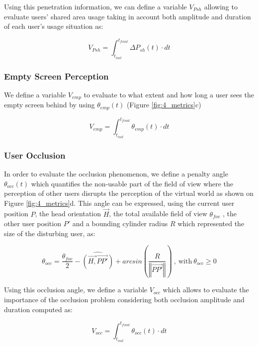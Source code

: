 Using this penetration information, we can define a variable $V_{Psh}$ allowing to evaluate users' shared area usage taking in account both amplitude and duration of each user's usage situation as:

\begin{equation}
V_{Psh}=\int_{t_{init}}^{t_{final}}\Delta P_{sh}(t)\cdot dt
\end{equation}

\subsubsection{Empty Screen Perception}
We define a variable $V_{emp}$ to evaluate to what extent and how long a user sees the empty screen behind by using $\theta_{emp}(t)$ (Figure \ref{fig:4_metrics}c)

\begin{equation}
V_{emp}=\int_{t_{init}}^{t_{final}}\theta_{emp}(t)\cdot dt
\end{equation}

\subsubsection{User Occlusion}
In order to evaluate the occlusion phenomenon, we define a penalty angle $\theta_{occ}(t)$ which quantifies the non-usable part of the field of view where the perception of other users disrupts the perception of the virtual world as shown on Figure \ref{fig:4_metrics}d. This angle can be expressed, using the current user position $P$, the head orientation $\overrightarrow{H}$, the total available field of view $\theta_{fov}$ , the other user position $P'$ and a bounding cylinder radius $R$ which represented the size of the disturbing user, as:

\begin{equation}
\theta_{occ}=\frac{\theta_{fov}}{2}-\widehat{(\overrightarrow{H,}\overrightarrow{PP'})}+arcsin(\frac{R}{\left\Vert \overrightarrow{PP'}\right\Vert })\mathrm{\:,\: with\:}\theta_{occ}\geq0
\end{equation}

Using this occlusion angle, we define a variable $V_{occ}$ which allows to evaluate the importance of the occlusion problem considering both occlusion amplitude and duration computed as:

\begin{equation}
V_{occ}=\int_{t_{init}}^{t_{final}}\theta_{occ}(t)\cdot dt
\end{equation}


